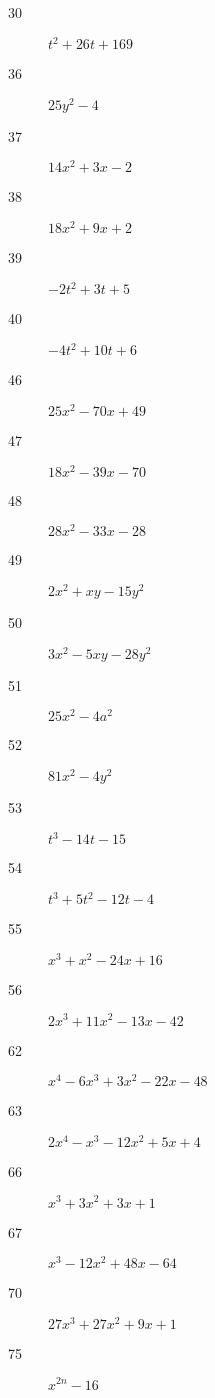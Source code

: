 \documentclass[letterpaper, landscape]{exam}
\begin{document}
\begin{description}
      \item[30] $t^2 + 26t + 169$

      \item[36] $25y^2 - 4$

      \item[37] $14x^2 + 3x - 2$

      \item[38] $18x^2 + 9x + 2$

      \item[39] $-2t^2 +3t + 5$

      \item[40] $-4t^2 + 10t + 6$

      \item[46] $25x^2 - 70x + 49$

      \item[47] $18x^2 - 39x - 70$

      \item[48] $28x^2 - 33x - 28$

      \item[49] $2x^2 + x y - 15y^2$

      \item[50] $3x^2 - 5xy - 28y^2$

      \item[51] $25x^2 - 4a^2$

      \item[52] $81x^2 - 4y^2$

      \item[53] $t^3 - 14t - 15$

      \item[54] $t^3 + 5t^2 - 12t - 4$

      \item[55] $x^3 + x^2 - 24x + 16$

      \item[56] $2x^3 + 11x^2 - 13x - 42$

      \item[62] $x^4 - 6x^3 + 3x^2 - 22x - 48$

      \item[63] $2x^4 - x^3 - 12x^2 + 5x + 4$

      \item[66] $x^3 + 3 x^2 + 3 x + 1$

      \item[67] $x^3 - 12 x^2 + 48 x - 64$

      \item[70] $27 x^3 + 27 x^2 + 9 x + 1$

      \item[75] $x^{2n} - 16$


\end{description}
\end{document}

